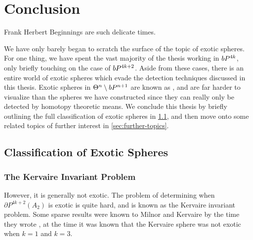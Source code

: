 \chapter{Conclusion}\label{chap:conclusion}

\begin{epigraph}{15em}{Frank Herbert}
	Beginnings are such delicate times.
\end{epigraph}

We have only barely began to scratch the surface of the topic of exotic spheres. For one thing, we have spent the vast majority of the thesis working in $bP^{4k}$, only briefly touching on the case of $bP^{4k+2}$. Aside from these cases, there is an entire world of exotic spheres which evade the detection techniques discussed in this thesis. Exotic spheres in $\Theta^n\setminus bP^{n+1}$ are known as , and are far harder to visualize than the spheres we have constructed since they can really only be detected by homotopy theoretic means. We conclude this thesis by briefly outlining the full classification of exotic spheres in \cref{sec:classification}, and then move onto some related topics of further interest in \cref{sec:further-topics}.

\section{Classification of Exotic Spheres}\label{sec:classification}

\subsection{The Kervaire Invariant Problem}

However, it is generally not exotic. The problem of determining when $\partial P^{4k+2}(A_2)$ is exotic is quite hard, and is known as the Kervaire invariant problem. Some sparse results were known to Milnor and Kervaire by the time they wrote \cite{milnorkervaire1963groups}, at the time it was known that the Kervaire sphere was not exotic when $k=1$ and $k=3$. 


